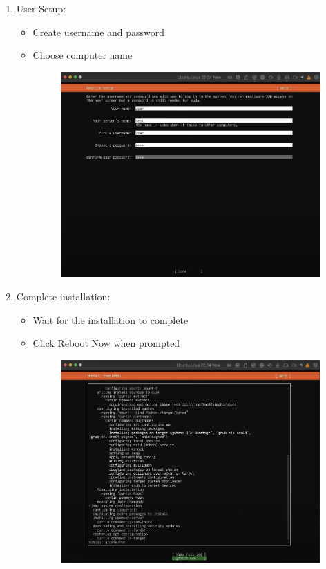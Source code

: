 \documentclass[11pt,a4paper]{article}
\begin{document}
\begin{enumerate}
    \item User Setup:
    \begin{itemize}
        \item Create username and password
        \item Choose computer name
        \begin{figure}[htp]
            \centering
            \includegraphics[width=0.6\linewidth]{images/step18.png}
        \end{figure}
    \end{itemize}
    \item Complete installation:
    \begin{itemize}
        \item Wait for the installation to complete
        \item Click Reboot Now when prompted
        \begin{figure}[htp]
            \centering
            \includegraphics[width=0.5\linewidth]{images/step19.png}
        \end{figure}
    \end{itemize}
\end{enumerate}

\end{document}
